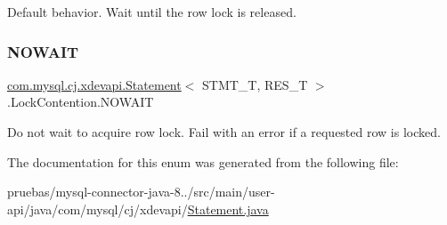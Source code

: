 Default behavior. Wait until the row lock is released. \mbox{\label{enumcom_1_1mysql_1_1cj_1_1xdevapi_1_1_statement_1_1_lock_contention_aeee9ef730095721fb0fb801706ad6a7f}} 
\subsubsection{\texorpdfstring{N\+O\+W\+A\+IT}{NOWAIT}}
{\footnotesize\ttfamily \mbox{\hyperlink{interfacecom_1_1mysql_1_1cj_1_1xdevapi_1_1_statement}{com.\+mysql.\+cj.\+xdevapi.\+Statement}}$<$ S\+T\+M\+T\+\_\+T, R\+E\+S\+\_\+T $>$.Lock\+Contention.\+N\+O\+W\+A\+IT}

Do not wait to acquire row lock. Fail with an error if a requested row is locked. 

The documentation for this enum was generated from the following file\+:\begin{DoxyCompactItemize}
\item 
pruebas/mysql-\/connector-\/java-\/8../src/main/user-\/api/java/com/mysql/cj/xdevapi/\mbox{\hyperlink{_statement_8java}{Statement.\+java}}\end{DoxyCompactItemize}
